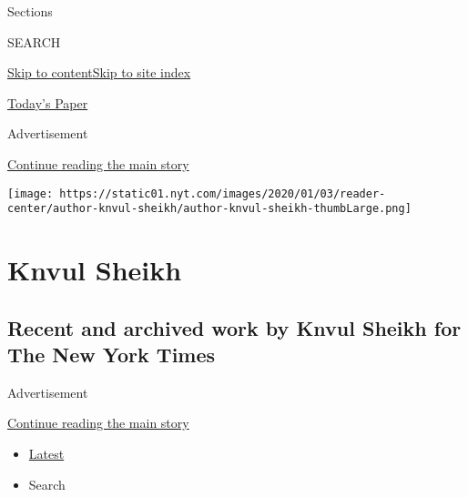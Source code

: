 Sections

SEARCH

\protect\hyperlink{site-content}{Skip to
content}\protect\hyperlink{site-index}{Skip to site index}

\href{https://myaccount.nytimes.com/auth/login?response_type=cookie\&client_id=vi}{}

\href{https://www.nytimes.com/section/todayspaper}{Today's Paper}

Advertisement

\protect\hyperlink{after-top}{Continue reading the main story}

\texttt{[image: https://static01.nyt.com/images/2020/01/03/reader-center/author-knvul-sheikh/author-knvul-sheikh-thumbLarge.png]}

\hypertarget{knvul-sheikh}{%
\section{Knvul Sheikh}\label{knvul-sheikh}}

\hypertarget{recent-and-archived-work-by-knvul-sheikh-for-the-new-york-times}{%
\subsection{Recent and archived work by Knvul Sheikh for The New York
Times}\label{recent-and-archived-work-by-knvul-sheikh-for-the-new-york-times}}

Advertisement

\protect\hyperlink{after-mid1}{Continue reading the main story}

\begin{itemize}
\tightlist
\item
  \protect\hyperlink{stream-panel}{Latest}
\item
  Search
\end{itemize}


